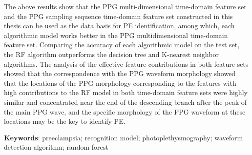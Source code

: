 The above results show that the PPG multi-dimensional time-domain feature set and the PPG sampling sequence time-domain feature set constructed in this thesis 
can be used as the data basis for PE identification, among which, each algorithmic model works better in the PPG multidimensional time-domain feature set.
Comparing the accuracy of each algorithmic model on the test set, the RF algorithm outperforms 
the decision tree and K-nearest neighbor algorithms. The analysis of the effective feature contributions in both feature sets showed that the correspondence 
with the PPG waveform morphology showed that the locations of the PPG morphology corresponding to the features with high contributions to the RF 
model in both time-domain feature sets were highly similar and concentrated near the end of the descending branch after the peak of the main PPG wave, 
and the specific morphology of the PPG waveform at these locations may be the key to identify PE.

\vspace{2em}

\textbf{Keywords}: preeclampsia; recognition model; photoplethysmography; waveform detection algorithm; random forest